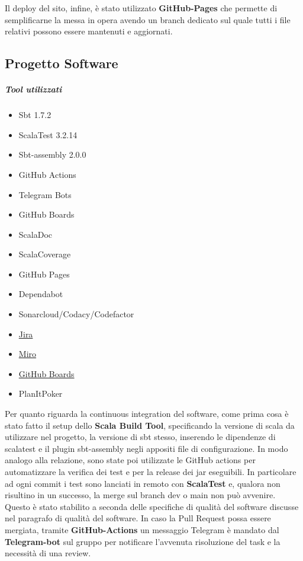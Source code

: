         Il deploy del sito, infine, è stato utilizzato \textbf{GitHub-Pages} che permette di semplificarne la messa in opera avendo un branch dedicato sul quale tutti i file relativi possono essere mantenuti e aggiornati.
        

    \subsection{Progetto Software}
        \subparagraph{Tool utilizzati}
        \begin{itemize}
            \item Sbt 1.7.2
            \item ScalaTest 3.2.14
            \item Sbt-assembly 2.0.0
            \item GitHub Actions
            \item Telegram Bots
            \item GitHub Boards
            \item ScalaDoc
            \item ScalaCoverage
            \item GitHub Pages
            \item Dependabot
            \item Sonarcloud/Codacy/Codefactor
            \item \href{https://riccardo-omiccioli.atlassian.net/jira/software/projects/IQ/boards/1/roadmap}{Jira}
            \item \href{https://miro.com/app/board/uXjVPN93uLs=/?share_link_id=56431555728}{Miro}
            \item \href{https://github.com/orgs/ISIQuiz/projects/3}{GitHub Boards}
            \item PlanItPoker \cite{planitpoker}
        \end{itemize}        
        Per quanto riguarda la continuous integration del software, come prima cosa è stato fatto il setup dello \textbf{Scala Build Tool}, specificando la versione di scala da utilizzare nel progetto, la versione di sbt stesso, inserendo le dipendenze di scalatest e il plugin sbt-assembly negli appositi file di configurazione. In modo analogo alla relazione, sono state poi utilizzate le GitHub actions per automatizzare la verifica dei test e per la release dei jar eseguibili. 
        In particolare ad ogni commit i test sono lanciati in remoto con \textbf{ScalaTest} e, qualora non risultino in un successo, la merge sul branch dev o main non può avvenire. Questo è stato stabilito a seconda delle specifiche di qualità del software discusse nel paragrafo di qualità del software. In caso la Pull Request possa essere mergiata, tramite \textbf{GitHub-Actions} un messaggio Telegram è mandato dal \textbf{Telegram-bot} sul gruppo per notificare l'avvenuta risoluzione del task e la necessità di una review.
